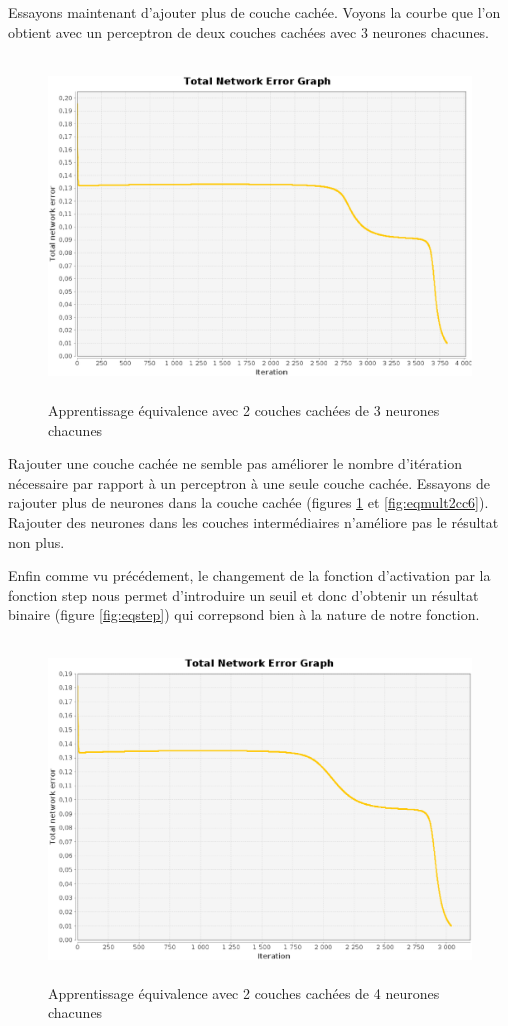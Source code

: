 \documentclass[twoside,openright,a4paper,11pt,french]{article}
\begin{document}
Essayons maintenant d'ajouter plus de couche cachée. Voyons la
courbe que l'on obtient avec un perceptron de deux couches cachées avec 3 
neurones chacunes.

\begin{figure}[ht]
\centering
\includegraphics[width=12cm,height=9cm]{./pics/eq/multi_3_3_def.eps}
\caption{Apprentissage équivalence avec 2 couches cachées de 3 neurones chacunes}
\end{figure}


Rajouter une couche cachée ne semble pas améliorer le nombre d'itération
nécessaire par rapport à un perceptron à une seule couche cachée.  Essayons de
rajouter plus de neurones dans la couche cachée (figures \ref{fig:eqmult2cc4}
et \ref{fig:eqmult2cc6}). Rajouter des neurones dans les couches intermédiaires
n'améliore pas le résultat non plus.

Enfin comme vu précédement, le changement de la fonction d'activation par la
fonction step nous permet d'introduire un seuil et donc d'obtenir un résultat
binaire (figure \ref{fig:eqstep}) qui correpsond bien à la nature de notre
fonction. 


\begin{figure}[ht]
\centering
\includegraphics[width=12cm,height=9cm]{./pics/eq/multi_4_4_def.eps}
\caption{Apprentissage équivalence avec 2 couches cachées de 4 neurones chacunes}
\label{fig:eqmult2cc4}
\end{figure}
\end{document}
